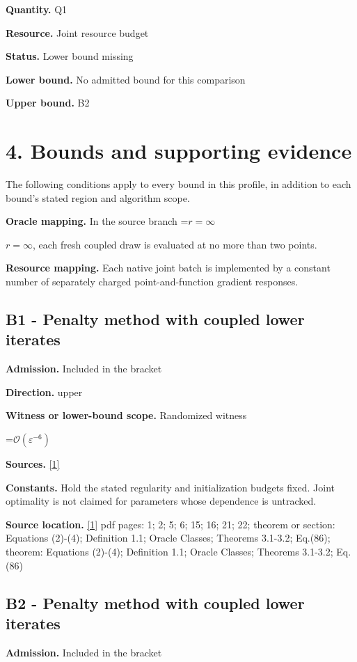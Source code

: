 \documentclass[10pt,a4paper]{article}
\newcommand{\AtlasMath}[1]{\par\begingroup\centering\setbox0=\hbox{$\displaystyle #1$}\ifdim\wd0>1.4\linewidth\typeout{ATLAS WIDE FORMULA: \the\wd0}\fi\ifdim\wd0>\linewidth\resizebox{\linewidth}{!}{\box0}\else\box0\fi\par\endgroup}
\newcommand{\AtlasInlineMath}[1]{\begingroup\setbox0=\hbox{$#1$}\ifdim\wd0>.4\linewidth\endgroup\AtlasMath{#1}\else\endgroup$#1$\fi}
\begin{document}
\textbf{Quantity.} Q1

\textbf{Resource.} Joint resource budget

\textbf{Status.} Lower bound missing

\textbf{Lower bound.} No admitted bound for this comparison

\textbf{Upper bound.} B2

\section{4. Bounds and supporting evidence}
The following conditions apply to every bound in this profile, in addition to each bound's stated region and algorithm scope.

\textbf{Oracle mapping.} In the source branch \AtlasInlineMath{r=\infty}, each fresh coupled draw is evaluated at no more than two points.

\textbf{Resource mapping.} Each native joint batch is implemented by a constant number of separately charged point-and-function gradient responses.

\subsection{B1 - Penalty method with coupled lower iterates}
\textbf{Admission.} Included in the bracket

\textbf{Direction.} upper

\textbf{Witness or lower-bound scope.} Randomized witness

\AtlasMath{\mathcal{O}(\varepsilon^{-6})}
\textbf{Sources.} \href{https://raw.githubusercontent.com/mlresearch/v235/main/assets/kwon24b/kwon24b.pdf}{[1]}

\textbf{Constants.} Hold the stated regularity and initialization budgets fixed. Joint optimality is not claimed for parameters whose dependence is untracked.

\textbf{Source location.} \href{https://raw.githubusercontent.com/mlresearch/v235/main/assets/kwon24b/kwon24b.pdf}{[1]} pdf pages: 1; 2; 5; 6; 15; 16; 21; 22; theorem or section: Equations (2)-(4); Definition 1.1; Oracle Classes; Theorems 3.1-3.2; Eq.(86); theorem: Equations (2)-(4); Definition 1.1; Oracle Classes; Theorems 3.1-3.2; Eq.(86)

\subsection{B2 - Penalty method with coupled lower iterates}
\textbf{Admission.} Included in the bracket
\end{document}

